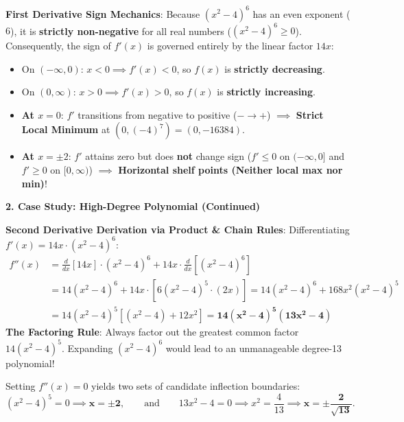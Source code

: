 \documentclass[11pt]{article}
\begin{document}
\textbf{First Derivative Sign Mechanics}:
Because $(x^2 - 4)^6$ has an even exponent ($6$), it is \textbf{strictly non-negative} for all real numbers ($(x^2 - 4)^6 \ge 0$). Consequently, the sign of $f'(x)$ is governed entirely by the linear factor $14x$:
\begin{itemize}[leftmargin=1.2em, itemsep=1pt, topsep=1pt]
  \item On $(-\infty, 0)$: $x < 0 \implies f'(x) < 0$, so $f(x)$ is \textbf{strictly decreasing}.
  \item On $(0, \infty)$: $x > 0 \implies f'(x) > 0$, so $f(x)$ is \textbf{strictly increasing}.
  \item \textbf{At $x = 0$}: $f'$ transitions from negative to positive ($-\to+$) $\implies$ \textcolor{accentGreen}{\textbf{Strict Local Minimum}} at $(0, (-4)^7) = (0, -16384)$.
  \item \textbf{At $x = \pm 2$}: $f'$ attains zero but does \textbf{not} change sign ($f' \le 0$ on $(-\infty, 0]$ and $f' \ge 0$ on $[0, \infty)$) $\implies$ \textbf{Horizontal shelf points (Neither local max nor min)}!
\end{itemize}

\clearpage

\textbf{\normalsize \textcolor{dukeNavy}{2. Case Study: High-Degree Polynomial (Continued)}}
\vspace{1pt}

\textbf{Second Derivative Derivation via Product \& Chain Rules}:
Differentiating $f'(x) = 14x \cdot (x^2 - 4)^6$:
\begin{align*}
f''(x) &= \frac{d}{dx}[14x] \cdot (x^2 - 4)^6 + 14x \cdot \frac{d}{dx}\left[(x^2 - 4)^6\right] \\
       &= 14(x^2 - 4)^6 + 14x \cdot \left[6(x^2 - 4)^5 \cdot (2x)\right] = 14(x^2 - 4)^6 + 168x^2(x^2 - 4)^5 \\
       &= 14(x^2 - 4)^5 \left[ (x^2 - 4) + 12x^2 \right] = \mathbf{14(x^2 - 4)^5 (13x^2 - 4)}
\end{align*}
\textbf{The Factoring Rule}: Always factor out the greatest common factor $14(x^2 - 4)^5$. Expanding $(x^2 - 4)^6$ would lead to an unmanageable degree-13 polynomial!

Setting $f''(x) = 0$ yields two sets of candidate inflection boundaries:
\[
(x^2 - 4)^5 = 0 \implies \mathbf{x = \pm 2}, \qquad \text{and} \qquad 13x^2 - 4 = 0 \implies x^2 = \frac{4}{13} \implies \mathbf{x = \pm \frac{2}{\sqrt{13}}}.
\]
\end{document}
